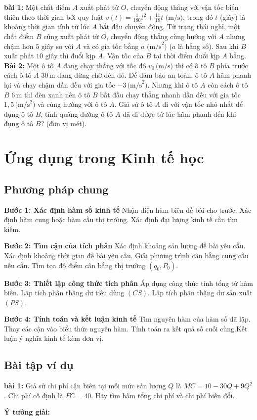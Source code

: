 \documentclass[12pt,a4paper,oneside]{book}
\theoremstyle{theorem}
\theoremstyle{definition}
\begin{document}
\noindent\textbf{bài 1:} Một chất điểm $A$ xuất phát từ $O$, chuyển động thẳng với vận tốc biến thiên theo thời gian bởi quy luật $v(t) = \frac{1}{180}t^2 + \frac{11}{18}t\text{ (m/s}\text{)}$, trong đó $t$ (giây) là khoảng thời gian tính từ lúc $A$ bắt đầu chuyển động. Từ trạng thái nghỉ, một chất điểm $B$ cũng xuất phát từ $O$, chuyển động thẳng cùng hướng với $A$ nhưng chậm hơn $5$ giây so với $A$ và có gia tốc bằng $a\text{ (m/s}^2\text{)}$ ($a$ là hằng số). Sau khi $B$ xuất phát $10$ giây thì đuổi kịp $A$. Vận tốc của $B$ tại thời điểm đuổi kịp $A$ bằng.
\noindent\textbf{Bài 2:} Một ô tô $A$ đang chạy thẳng với tốc độ $v_0\,\text{(m/s)}$ thì có ô tô $B$ phía trước cách ô tô $A$ $30\,\text{m}$ đang dừng chờ đèn đỏ. Để đảm bảo an toàn, ô tô $A$ hãm phanh lại và chạy chậm dần đều với gia tốc $-3\,\text{(m/s}^2\text{)}$. Nhưng khi ô tô $A$ còn cách ô tô $B$ $6\,\text{m}$ thì đèn xanh nên ô tô $B$ bắt đầu chạy thẳng nhanh dần đều với gia tốc $1,5\,\text{(m/s}^2\text{)}$ và cùng hướng với ô tô $A$. Giả sử ô tô $A$ đi với vận tốc nhỏ nhất để đụng ô tô $B$, tính quãng đường ô tô $A$ đã đi được từ lúc hãm phanh đến khi đụng ô tô $B$? (đơn vị mét).
\section{Ứng dụng trong Kinh tế học}
\subsection{Phương pháp chung}

\textbf{Bước 1: Xác định hàm số kinh tế}
Nhận diện hàm biên đề bài cho trước. Xác định hàm cung hoặc hàm cầu thị trường. Xác định đại lượng kinh tế cần tìm kiếm.

\textbf{Bước 2: Tìm cận của tích phân}
Xác định khoảng sản lượng đề bài yêu cầu. Xác định khoảng thời gian đề bài yêu cầu. Giải phương trình cân bằng cung cầu nếu cần. Tìm tọa độ điểm cân bằng thị trường $(q_0, P_0)$.

\textbf{Bước 3: Thiết lập công thức tích phân}
Áp dụng công thức tính tổng từ hàm biên. Lập tích phân thặng dư tiêu dùng $(CS)$. Lập tích phân thặng dư sản xuất $(PS)$.

\textbf{Bước 4: Tính toán và kết luận kinh tế}
Tìm nguyên hàm của hàm số đã lập. Thay các cận vào biểu thức nguyên hàm. Tính toán ra kết quả số cuối cùng.Kết luận ý nghĩa kinh tế kèm đơn vị.
\subsection{Bài tập ví dụ}
\noindent\textbf{bài 1:} Giả sử chi phí cận biên tại mỗi mức sản lượng $Q$ là $MC = 10 - 30Q + 9Q^2$. Chi phí cố định là $FC = 40$. Hãy tìm hàm tổng chi phí và chi phí biến đổi.
\begin{center}
    \textbf{Ý tưởng giải:}
\end{center}
\end{document}
